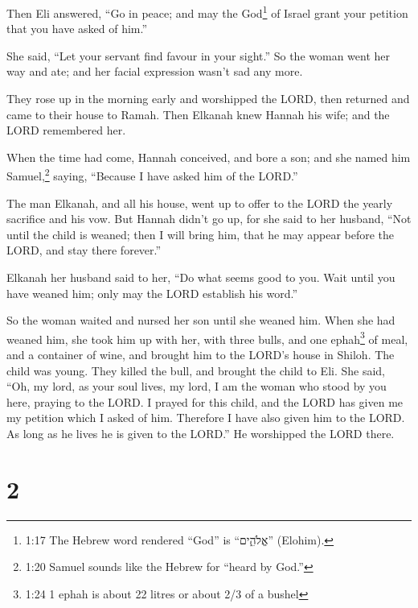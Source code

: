  Then Eli answered, ``Go in peace; and may the
God\footnote{1:17 The Hebrew word rendered ``God'' is ``אֱלֹהִ֑ים''
  (Elohim).} of Israel grant your petition that you have asked of him.''

 She said, ``Let your servant find favour in your sight.''
So the woman went her way and ate; and her facial expression wasn't sad
any more.

 They rose up in the morning early and worshipped the LORD,
then returned and came to their house to Ramah. Then Elkanah knew Hannah
his wife; and the LORD remembered her.

 When the time had come, Hannah conceived, and bore a son;
and she named him Samuel,\footnote{1:20 Samuel sounds like the Hebrew
  for ``heard by God.''} saying, ``Because I have asked him of the
LORD.''

 The man Elkanah, and all his house, went up to offer to
the LORD the yearly sacrifice and his vow.  But Hannah
didn't go up, for she said to her husband, ``Not until the child is
weaned; then I will bring him, that he may appear before the LORD, and
stay there forever.''

 Elkanah her husband said to her, ``Do what seems good to
you. Wait until you have weaned him; only may the LORD establish his
word.''

So the woman waited and nursed her son until she weaned him.
 When she had weaned him, she took him up with her, with
three bulls, and one ephah\footnote{1:24 1 ephah is about 22 litres or
  about 2/3 of a bushel} of meal, and a container of wine, and brought
him to the LORD's house in Shiloh. The child was young. 
They killed the bull, and brought the child to Eli.  She
said, ``Oh, my lord, as your soul lives, my lord, I am the woman who
stood by you here, praying to the LORD.  I prayed for this
child, and the LORD has given me my petition which I asked of him.
 Therefore I have also given him to the LORD. As long as he
lives he is given to the LORD.'' He worshipped the LORD there.

\hypertarget{section-1}{%
\section{2}\label{section-1}}


